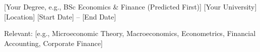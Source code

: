 

\begin{cventries}

  \cventry
    {[Your Degree, e.g., BSc Economics & Finance (Predicted First)]} %
    {[Your University]} %
    {[Location]} %
    {[Start Date] -- [End Date]} %
    {
      \begin{cvitems}
        \item {Relevant: [e.g., Microeconomic Theory, Macroeconomics, Econometrics, Financial Accounting, Corporate Finance]}
      \end{cvitems}
    }

\end{cventries}
